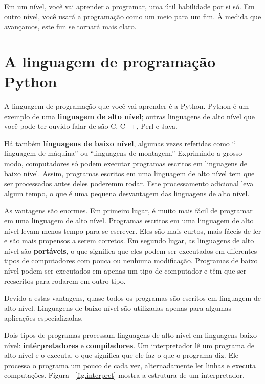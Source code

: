 \documentclass[10pt]{book}
\begin{document}
Em um nível, você vai aprender a programar, uma útil
habilidade por si só. Em outro nível, você usará a programação como um meio para
um fim. À medida que avançamos, este fim se tornará mais claro.

\section{A linguagem de programação Python}

A linguagem de programação que você vai aprender é a Python. Python é
um exemplo de uma {\bf linguagem de alto nível}; outras linguagens de alto nível
que você pode ter ouvido falar de são C, C++, Perl e Java.

Há
também {\bf línguagens de baixo nível}, algumas vezes referidas como `` linguagem de
máquina'' ou ``linguagens de montagem.'' Exprimindo a grosso modo, computadores
só podem executar programas escritos em linguagens de baixo nível. Assim,
programas escritos em uma linguagem de alto nível tem que ser processados ​​antes
deles poderemm rodar. Este processamento adicional leva algum tempo, o que é uma pequena
desvantagem das linguagens de alto nível.

As vantagens são enormes. Em primeiro lugar, é muito mais fácil de programar
em uma linguagem de alto nível. Programas escritos em uma linguagem de alto nível
levam menos tempo para se escrever. Eles são mais curtos, mais fáceis de ler e
são mais propensos a serem corretos. Em segundo lugar, as linguagens de alto nível são {\bf
portáveis}, o que significa que eles podem ser executados em diferentes tipos de computadores
com pouca ou nenhuma modificação. Programas de baixo nível podem ser executados em apenas um
tipo de computador e têm que ser reescritos para rodarem em outro tipo.

Devido a estas vantagens, quase todos os programas são escritos em linguagem de alto
nível. Linguagens de baixo nível são utilizadas apenas para algumas aplicações
especializadas.

Dois tipos de programas processam linguagens de alto nível em linguagens baixo
nível: {\bf intérpretadores} e {\bf compiladores}. Um interpretador
lê um programa de alto nível e o executa, o que significa que ele faz o que
o programa diz. Ele processa o programa um pouco de cada vez,
alternadamente ler linhas e executa computações.
Figura~ \ref{fig.interpret} mostra a estrutura de um interpretador.
\end{document}

